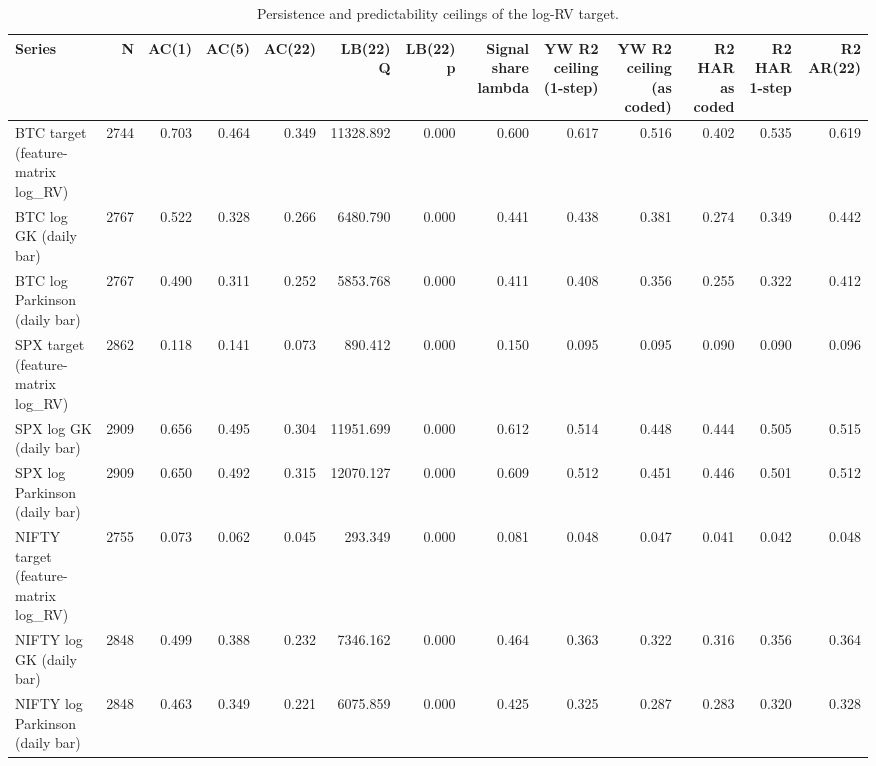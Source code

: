 \begin{table}
\caption{Persistence and predictability ceilings of the log-RV target.}
\label{tab:target_quality}
\begin{tabular}{lrrrrrrrrrrrr}
\toprule
Series & N & AC(1) & AC(5) & AC(22) & LB(22) Q & LB(22) p & Signal share lambda & YW R2 ceiling (1-step) & YW R2 ceiling (as coded) & R2 HAR as coded & R2 HAR 1-step & R2 AR(22) \\
\midrule
BTC target (feature-matrix log\_RV) & 2744 & 0.703 & 0.464 & 0.349 & 11328.892 & 0.000 & 0.600 & 0.617 & 0.516 & 0.402 & 0.535 & 0.619 \\
BTC log GK (daily bar) & 2767 & 0.522 & 0.328 & 0.266 & 6480.790 & 0.000 & 0.441 & 0.438 & 0.381 & 0.274 & 0.349 & 0.442 \\
BTC log Parkinson (daily bar) & 2767 & 0.490 & 0.311 & 0.252 & 5853.768 & 0.000 & 0.411 & 0.408 & 0.356 & 0.255 & 0.322 & 0.412 \\
SPX target (feature-matrix log\_RV) & 2862 & 0.118 & 0.141 & 0.073 & 890.412 & 0.000 & 0.150 & 0.095 & 0.095 & 0.090 & 0.090 & 0.096 \\
SPX log GK (daily bar) & 2909 & 0.656 & 0.495 & 0.304 & 11951.699 & 0.000 & 0.612 & 0.514 & 0.448 & 0.444 & 0.505 & 0.515 \\
SPX log Parkinson (daily bar) & 2909 & 0.650 & 0.492 & 0.315 & 12070.127 & 0.000 & 0.609 & 0.512 & 0.451 & 0.446 & 0.501 & 0.512 \\
NIFTY target (feature-matrix log\_RV) & 2755 & 0.073 & 0.062 & 0.045 & 293.349 & 0.000 & 0.081 & 0.048 & 0.047 & 0.041 & 0.042 & 0.048 \\
NIFTY log GK (daily bar) & 2848 & 0.499 & 0.388 & 0.232 & 7346.162 & 0.000 & 0.464 & 0.363 & 0.322 & 0.316 & 0.356 & 0.364 \\
NIFTY log Parkinson (daily bar) & 2848 & 0.463 & 0.349 & 0.221 & 6075.859 & 0.000 & 0.425 & 0.325 & 0.287 & 0.283 & 0.320 & 0.328 \\
\bottomrule
\end{tabular}
\end{table}

